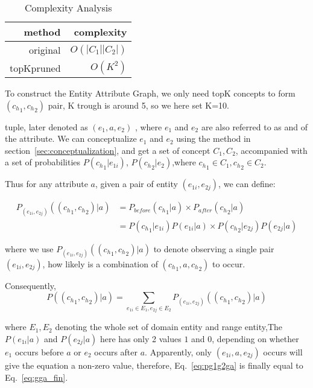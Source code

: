 \begin{table}[htbp]
  \centering
  \caption{Complexity Analysis}
    \begin{tabular}{rr}
    \toprule
    method & complexity \\
    \midrule
    original &  $O(|C_1||C_2|)$ \\
    topKpruned & $O(K^2)$ \\
    \bottomrule
    \end{tabular}%
  \label{tab:complexity}%
\end{table}%



To construct the Entity Attribute Graph, we only need topK concepts to form $({c_h}_1,{c_h}_2)$ pair, K trough  is around 5, so we here set K=10.

tuple, later denoted as  $(e_1, a, e_2)$ , where $e_1$ and $e_2$ are also referred to as  and  of the attribute. We can conceptualize $e_1$ and $e_2$ using the method in section~\ref{sec:conceptualization}, and get a set of concept $C_1,C_2$, accompanied with a set of probabilities $P({c_h}_{1}|e_{1i})$, $P({c_h}_{2}|e_2)$,where ${{c_h}_{1} \in C_1},{{c_h}_{2} \in C_2}$.


Thus for any attribute $a$, given a pair of entity $(e_{1i},e_{2j})$, we can define:


\begin{equation} \begin{split} P_{(e_{1i},e_{2j})}(({c_h}_{1},{c_h}_{2}) |a)&=P_{before}({c_h}_1|a) \times P_{after}({c_h}_2|a) \\&=  P({c_h}_{1}|e_{1i}) P(e_{1i}|a) \times P({c_h}_{2}|e_{2j})P(e_{2j}|a) \end{split} \label{eq:giga}\end{equation}


where we use $P_{(e_{1i},e_{2j})}(({c_h}_{1},{c_h}_{2}) |a)$ to denote observing a single pair $(e_{1i},e_{2j})$, how likely is a combination of $({c_h}_{1},a,{c_h}_{2})$ to occur.




Consequently,
\begin{equation} P(({c_h}_{1},{c_h}_{2}) |a)=\sum_{  e_{1i} \in E_1 ,e_{2j} \in E_2} P_{(e_{1i},e_{2j})}(({c_h}_{1},{c_h}_{2}) |a) \label{eq:pg1g2ga}\end{equation}

where $E_1,E_2$ denoting the whole set of domain entity and range entity,The  $P(e_{1i}|a)$ and $P(e_{2j}|a)$ here has only 2 values $1$ and  $0$, depending on whether  $e_1$ occurs before $a$ or $e_2$ occurs after $a$. Apparently, only $(e_{1i}, a, e_{2j})$ occurs will give the equation a non-zero value, therefore, Eq.~\ref{eq:pg1g2ga} is finally equal to Eq.~\ref{eq:gga_fin}.

